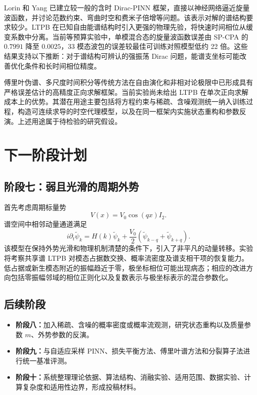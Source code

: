 \documentclass[UTF8,a4paper,12pt,fontset=fandol]{ctexart}
\begin{document}
Lorin 和 Yang 已建立较一般的含时 Dirac-PINN 框架，直接以神经网络逼近旋量波函数，并讨论范数约束、弯曲时空和费米子倍增等问题\cite{lorin2022}。该表示对解的谱结构要求较少。LTPB 在已知自由能谱结构时引入更强的物理先验，将快速时间相位从缓变系数中分离。当前等预算实验中，单模混合态的旋量波函数误差由 SP-CPA 的 $0.7991$ 降至 $0.0025$，33 模态波包的误差较最佳可训练对照模型低约 22 倍。这些结果支持以下推断：对于谱结构可辨认的强振荡 Dirac 问题，能谱支坐标可能改善优化条件和长时间相位精度。

傅里叶伪谱、多尺度时间积分等传统方法在自由演化和非相对论极限中已形成具有严格误差估计的高精度正向求解框架\cite{bao2016}。当前实验尚未给出 LTPB 在单次正向求解成本上的优势。其潜在用途主要包括将方程约束与稀疏、含噪观测统一纳入训练过程，构造可连续求导的时空代理模型，以及在同一框架内实施状态重构和参数反演。上述用途属于待检验的研究假设。

\section{下一阶段计划}

\subsection{阶段七：弱且光滑的周期外势}

首先考虑周期标量势
\begin{equation}
V(x)=V_0\cos(qx)I_2.
\end{equation}
谱空间中相邻动量通道满足
\begin{equation}
i\partial_t\widetilde\psi_k=
H(k)\widetilde\psi_k+\frac{V_0}{2}
\left(\widetilde\psi_{k-q}+\widetilde\psi_{k+q}\right).
\end{equation}
该模型在保持外势光滑和物理机制清楚的条件下，引入了非平凡的动量转移。实验将考察共享谱 LTPB 对模态占据数交换、概率流密度及谱支相干项的恢复能力。低占据或新生模态附近的振幅趋近于零，极坐标相位可能出现病态；相应的改进方向包括零振幅邻域的相位正则化以及复数表示与极坐标表示的混合参数化。

\subsection{后续阶段}

\begin{itemize}
  \item \textbf{阶段八：}加入稀疏、含噪的概率密度或概率流观测，研究状态重构以及质量参数 $m$、外势参数的反演。
  \item \textbf{阶段九：}与自适应采样 PINN、损失平衡方法、傅里叶谱方法和分裂算子法进行统一基准评测。
  \item \textbf{阶段十：}系统整理理论依据、算法结构、消融实验、适用范围、数据实验、计算复杂度和适用性边界，形成投稿材料。
\end{itemize}
\end{document}
